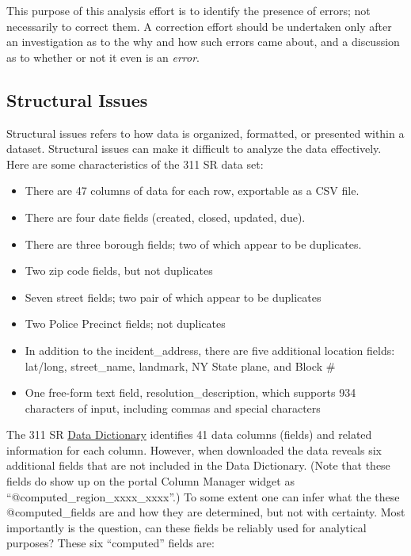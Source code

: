 \documentclass[linenumber]{jdsart}
\begin{document}
This purpose of this analysis effort is to identify the presence of 
errors; not necessarily to correct them. A correction effort should
be undertaken only after an investigation as to the why and how 
such errors came about, and a discussion as to whether or not it 
even is an \textit{error}. 


\subsection{Structural Issues}
\label{sec:structural}
Structural issues refers to how data is organized, formatted, 
or presented within a dataset. Structural issues can make 
it difficult to analyze the data effectively. Here are some 
characteristics of the 311 SR data set:

\begin{itemize}
	\item There are 47 columns of data for each row, exportable as a CSV file.
	
	\item There are four date fields (created, closed, updated, due).
	
	\item There are three borough fields; two of which appear to be duplicates.
	
	\item Two zip code fields, but not duplicates
	
	\item Seven street fields; two pair of which appear to be duplicates
	
	\item Two Police Precinct fields; not duplicates
	
	\item In addition to the incident\_address, there are five additional location fields: 
	lat/long, street\_name, landmark, NY State plane, and Block \#
	
	\item One free-form text field, resolution\_description, which 
	supports 934 characters of input, including commas and special characters
\end{itemize}

The 311 SR \href{https://data.cityofnewyork.us/api/views/erm2-nwe9/files/b372b884-f86a-453b-ba16-1fe06ce9d212?download=true&filename=311_ServiceRequest_2010-Present_DataDictionary_Updated_2023.xlsx}{Data Dictionary}
 identifies 41 data columns (fields) and related information 
 for each column. However, when downloaded the data reveals 
 six additional fields that are not included in the Data Dictionary. 
(Note that these fields do show up on the portal Column Manager widget
 as ``@computed\_region\_xxxx\_xxxx''.) To some extent one can infer 
 what the these @computed\_fields are and how they are determined, but
 not with certainty. Most importantly is the question, can these fields be reliably 
 used for analytical purposes?  These six ``computed'' fields are:
\end{document}
